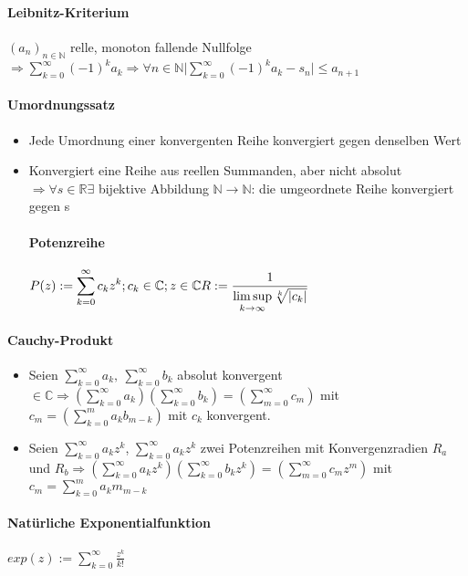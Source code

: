 \documentclass[paper=a4,paper=landscape, fontsize=6pt,DIV=25, twoside]{scrartcl}
\newcommand{\real}{{\mathbb{R}}}
\newcommand{\compl}{\mathbb{C}}
\newcommand{\nat}{\mathbb{N}}
\newcommand{\aseq}{(a_n)_{n \in \nat}}
\begin{document}
\begin{multicols*}{4}
		\paragraph{Leibnitz-Kriterium}
		$\aseq$ relle, monoton fallende Nullfolge $\displaystyle \Rightarrow \sum_{k=0}^{\infty} (-1)^ka_k \Rightarrow \forall n \in \nat \lvert \sum_{k=0}^{\infty}(-1)^ka_k-s_n \rvert \leq  a_{n+1}$
		\paragraph{Umordnungssatz}\begin{itemize}
			\item Jede Umordnung einer konvergenten Reihe konvergiert gegen denselben Wert
			\item Konvergiert eine Reihe aus reellen Summanden, aber nicht absolut $\Rightarrow \forall s \in \real \exists$ bijektive Abbildung $\nat \rightarrow \nat$: die umgeordnete Reihe konvergiert gegen s
		\paragraph{Potenzreihe}
		$\displaystyle P(z) := \sum_{k=0}^{\infty} c_kz^k; c_k \in \compl; z \in \compl\\R := \frac{1}{\limsup\limits_{k \rightarrow \infty} \sqrt[k]{|c_k|}}$
		\end{itemize}
		\paragraph{Cauchy-Produkt}
		\begin{itemize}
			\item Seien $\displaystyle \sum_{k=0}^{\infty} a_k,\:\sum_{k=0}^{\infty} b_k$ absolut konvergent $\displaystyle \in \compl \Rightarrow (\sum_{k=0}^{\infty} a_k) (\sum_{k=0}^{\infty} b_k) = (\sum_{m=0}^{\infty} c_m)$ mit $\displaystyle c_m=(\sum_{k=0}^{m} a_kb_{m-k})$ mit $c_k$ konvergent.
			\item Seien $\displaystyle \sum_{k=0}^{\infty} a_kz^k$, $\sum_{k=0}^{\infty} a_kz^k$ zwei Potenzreihen mit Konvergenzradien $R_a$ und $\displaystyle R_b \Rightarrow (\sum_{k=0}^{\infty} a_kz^k)(\sum_{k=0}^{\infty} b_kz^k)=(\sum_{m=0}^{\infty} c_mz^m)$ mit $\displaystyle c_m = \sum_{k=0}^{m} a_km_{m-k}$
		\end{itemize}
		\paragraph{Natürliche Exponentialfunktion}
		$\displaystyle exp(z) := \sum_{k=0}^{\infty} \frac{z^k}{k!}$

\end{multicols*}
\end{document}
